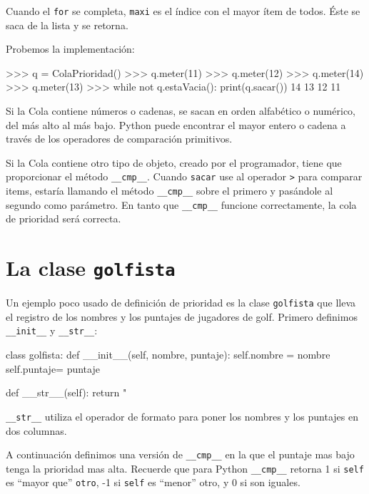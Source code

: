 
Cuando el \texttt{for} se completa, \texttt{maxi} es el índice con
el mayor ítem de todos. Éste se saca de la lista y se retorna.

Probemos la implementación:

\beforeverb 
\begin{pyconcode}
>>> q = ColaPrioridad()
>>> q.meter(11)
>>> q.meter(12)
>>> q.meter(14)
>>> q.meter(13)
>>> while not q.estaVacia(): print(q.sacar())
14
13
12
11
\end{pyconcode}
\afterverb Si la Cola contiene números o cadenas, se sacan en orden
alfabético o numérico, del más alto al más bajo. Python puede encontrar
el mayor entero o cadena a través de los operadores de comparación
primitivos.

Si la Cola contiene otro tipo de objeto, creado por el programador,
tiene que proporcionar el método \texttt{\_\_cmp\_\_}. Cuando \texttt{sacar}
use al operador \texttt{>} para comparar items, estaría llamando el
método \texttt{\_\_cmp\_\_} sobre el primero y pasándole al segundo
como parámetro. En tanto que \texttt{\_\_cmp\_\_} funcione correctamente,
la cola de prioridad será correcta.

\section{La clase \texttt{golfista}}

   

Un ejemplo poco usado de definición de prioridad es la clase \texttt{golfista}
que lleva el registro de los nombres y los puntajes de jugadores de
golf. Primero definimos \texttt{\_\_init\_\_} y \texttt{\_\_str\_\_}:

\beforeverb 
\begin{pythoncode}
class golfista:
  def __init__(self, nombre, puntaje):
    self.nombre = nombre
    self.puntaje= puntaje

  def __str__(self):
    return "%
\end{pythoncode}
\afterverb \texttt{\_\_str\_\_} utiliza el operador de formato para
poner los nombres y los puntajes en dos columnas.

 

A continuación definimos una versión de \texttt{\_\_cmp\_\_} en la
que el puntaje mas bajo tenga la prioridad mas alta. Recuerde que
para Python \texttt{\_\_cmp\_\_} retorna 1 si \texttt{self} es ``mayor
que'' \texttt{otro}, -1 si \texttt{self} es ``menor'' otro, y 0
si son iguales.

